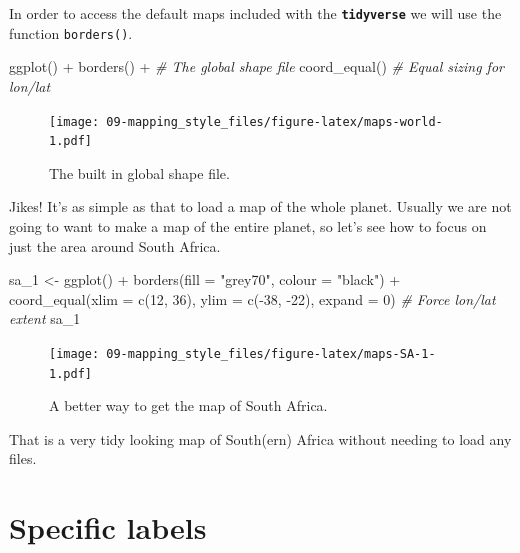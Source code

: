 \documentclass[
]{book}
\newenvironment{Shaded}{\begin{snugshade}}{\end{snugshade}}
\newcommand{\AttributeTok}[1]{\textcolor[rgb]{0.77,0.63,0.00}{#1}}
\newcommand{\CommentTok}[1]{\textcolor[rgb]{0.56,0.35,0.01}{\textit{#1}}}
\newcommand{\DecValTok}[1]{\textcolor[rgb]{0.00,0.00,0.81}{#1}}
\newcommand{\FunctionTok}[1]{\textcolor[rgb]{0.00,0.00,0.00}{#1}}
\newcommand{\NormalTok}[1]{#1}
\newcommand{\OtherTok}[1]{\textcolor[rgb]{0.56,0.35,0.01}{#1}}
\newcommand{\SpecialCharTok}[1]{\textcolor[rgb]{0.00,0.00,0.00}{#1}}
\newcommand{\StringTok}[1]{\textcolor[rgb]{0.31,0.60,0.02}{#1}}
\begin{document}
In order to access the default maps included with the \textbf{\texttt{tidyverse}} we will use the function \texttt{borders()}.

\begin{Shaded}
\begin{Highlighting}[]
\FunctionTok{ggplot}\NormalTok{() }\SpecialCharTok{+}
  \FunctionTok{borders}\NormalTok{() }\SpecialCharTok{+} \CommentTok{\# The global shape file}
  \FunctionTok{coord\_equal}\NormalTok{() }\CommentTok{\# Equal sizing for lon/lat }
\end{Highlighting}
\end{Shaded}

\begin{figure}
\centering
\texttt{[image: 09-mapping\_style\_files/figure-latex/maps-world-1.pdf]}
\caption{\label{fig:maps-world}The built in global shape file.}
\end{figure}

Jikes! It's as simple as that to load a map of the whole planet. Usually we are not going to want to make a map of the entire planet, so let's see how to focus on just the area around South Africa.

\begin{Shaded}
\begin{Highlighting}[]
\NormalTok{sa\_1 }\OtherTok{\textless{}{-}} \FunctionTok{ggplot}\NormalTok{() }\SpecialCharTok{+}
  \FunctionTok{borders}\NormalTok{(}\AttributeTok{fill =} \StringTok{"grey70"}\NormalTok{, }\AttributeTok{colour =} \StringTok{"black"}\NormalTok{) }\SpecialCharTok{+}
  \FunctionTok{coord\_equal}\NormalTok{(}\AttributeTok{xlim =} \FunctionTok{c}\NormalTok{(}\DecValTok{12}\NormalTok{, }\DecValTok{36}\NormalTok{), }\AttributeTok{ylim =} \FunctionTok{c}\NormalTok{(}\SpecialCharTok{{-}}\DecValTok{38}\NormalTok{, }\SpecialCharTok{{-}}\DecValTok{22}\NormalTok{), }\AttributeTok{expand =} \DecValTok{0}\NormalTok{) }\CommentTok{\# Force lon/lat extent}
\NormalTok{sa\_1}
\end{Highlighting}
\end{Shaded}

\begin{figure}
\centering
\texttt{[image: 09-mapping\_style\_files/figure-latex/maps-SA-1-1.pdf]}
\caption{\label{fig:maps-SA-1}A better way to get the map of South Africa.}
\end{figure}

That is a very tidy looking map of South(ern) Africa without needing to load any files.

\hypertarget{specific-labels}{%
\section{Specific labels}\label{specific-labels}}
\end{document}
